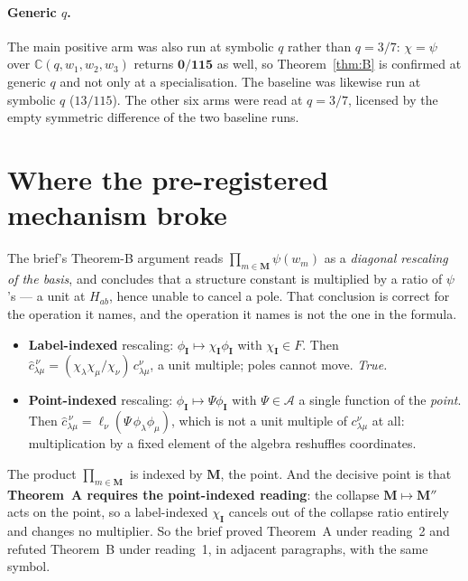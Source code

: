 \documentclass[11pt]{article}
\theoremstyle{plain}
\theoremstyle{definition}
\theoremstyle{remark}
\theoremstyle{plain}
\newcommand{\bI}{\mathbf{I}}
\newcommand{\bM}{\mathbf{M}}
\begin{document}
\paragraph{Generic $q$.}  The main positive arm was also run at symbolic $q$
rather than $q=3/7$: $\chi=\psi$ over
$\mathbb{C}(q,w_1,w_2,w_3)$ returns $\mathbf{0/115}$ as well, so
Theorem~\ref{thm:B} is confirmed at generic $q$ and not only at a specialisation.
The baseline was likewise run at symbolic $q$ ($13/115$).  The other six arms were
read at $q=3/7$, licensed by the empty symmetric difference of the two baseline
runs.


\section{Where the pre-registered mechanism broke}
\label{sec:error}

The brief's Theorem-B argument reads $\prod_{m\in\bM}\psi(w_m)$ as a
\emph{diagonal rescaling of the basis}, and concludes that a structure constant
is multiplied by a ratio of $\psi$'s --- a unit at $H_{ab}$, hence unable to
cancel a pole.  That conclusion is correct for the operation it names, and the
operation it names is not the one in the formula.

\begin{itemize}
\item \textbf{Label-indexed} rescaling: $\phi_{\bI}\mapsto\chi_{\bI}\phi_{\bI}$
  with $\chi_{\bI}\in F$.  Then
  $\widehat c^{\,\nu}_{\lambda\mu}=(\chi_\lambda\chi_\mu/\chi_\nu)\,c^{\nu}_{\lambda\mu}$,
  a unit multiple; poles cannot move.  \emph{True.}
\item \textbf{Point-indexed} rescaling: $\phi_{\bI}\mapsto\Psi\phi_{\bI}$ with
  $\Psi\in\mathcal{A}$ a single function of the \emph{point}.  Then
  $\widehat c^{\,\nu}_{\lambda\mu}=\ell_\nu(\Psi\,\phi_\lambda\phi_\mu)$, which is
  not a unit multiple of $c^{\nu}_{\lambda\mu}$ at all: multiplication by a fixed
  element of the algebra reshuffles coordinates.
\end{itemize}

The product $\prod_{m\in\bM}$ is indexed by $\bM$, the point.  And the decisive
point is that \textbf{Theorem~A requires the point-indexed reading}: the collapse
$\bM\mapsto\bM''$ acts on the point, so a label-indexed $\chi_{\bI}$ cancels out
of the collapse ratio entirely and changes no multiplier.  So the brief proved
Theorem~A under reading~2 and refuted Theorem~B under reading~1, in adjacent
paragraphs, with the same symbol.
\end{document}
